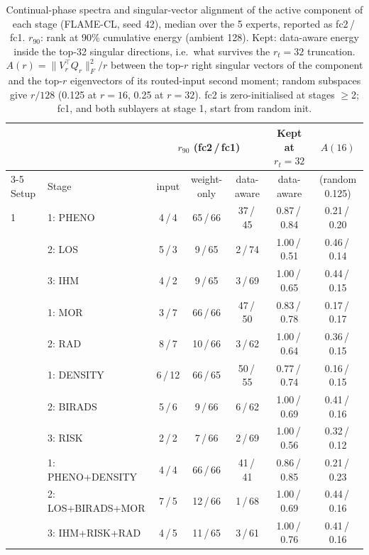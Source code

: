 \begin{table}[t]
\centering
\scriptsize
\setlength{\tabcolsep}{3.2pt}
\caption{Continual-phase spectra and singular-vector alignment of the active component of each stage (FLAME-CL, seed 42), median over the 5 experts, reported as fc2\,/\,fc1. $r_{90}$: rank at 90\% cumulative energy (ambient 128). Kept: data-aware energy inside the top-32 singular directions, i.e.\ what survives the $r_t{=}32$ truncation. $A(r)=\lVert V_r^\top Q_r\rVert_F^2/r$ between the top-$r$ right singular vectors of the component and the top-$r$ eigenvectors of its routed-input second moment; random subspaces give $r/128$ (0.125 at $r{=}16$, 0.25 at $r{=}32$). fc2 is zero-initialised at stages $\geq$2; fc1, and both sublayers at stage 1, start from random init.}
\label{tab:cl-spectra-alignment}
\begin{tabular}{@{}llccccc@{}}
\toprule
 & & \multicolumn{3}{c}{$r_{90}$ (fc2\,/\,fc1)} & Kept at $r_t{=}32$ & $A(16)$ \\
\cmidrule(lr){3-5}
Setup & Stage & input & weight-only & data-aware & data-aware & (random 0.125) \\
\midrule
1 & 1: PHENO & 4\,/\,4 & 65\,/\,66 & 37\,/\,45 & 0.87\,/\,0.84 & 0.21\,/\,0.20 \\
 & 2: LOS & 5\,/\,3 & 9\,/\,65 & 2\,/\,74 & 1.00\,/\,0.51 & 0.46\,/\,0.14 \\
 & 3: IHM & 4\,/\,2 & 9\,/\,65 & 3\,/\,69 & 1.00\,/\,0.65 & 0.44\,/\,0.15 \\
\addlinespace[2pt]
2 & 1: MOR & 3\,/\,7 & 66\,/\,66 & 47\,/\,50 & 0.83\,/\,0.78 & 0.17\,/\,0.17 \\
 & 2: RAD & 8\,/\,7 & 10\,/\,66 & 3\,/\,62 & 1.00\,/\,0.64 & 0.36\,/\,0.15 \\
\addlinespace[2pt]
3 & 1: DENSITY & 6\,/\,12 & 66\,/\,65 & 50\,/\,55 & 0.77\,/\,0.74 & 0.16\,/\,0.15 \\
 & 2: BIRADS & 5\,/\,6 & 9\,/\,66 & 6\,/\,62 & 1.00\,/\,0.69 & 0.41\,/\,0.16 \\
 & 3: RISK & 2\,/\,2 & 7\,/\,66 & 2\,/\,69 & 1.00\,/\,0.56 & 0.32\,/\,0.12 \\
\addlinespace[2pt]
4 & 1: PHENO+DENSITY & 4\,/\,4 & 66\,/\,66 & 41\,/\,41 & 0.86\,/\,0.85 & 0.21\,/\,0.23 \\
 & 2: LOS+BIRADS+MOR & 7\,/\,5 & 12\,/\,66 & 1\,/\,68 & 1.00\,/\,0.69 & 0.44\,/\,0.16 \\
 & 3: IHM+RISK+RAD & 4\,/\,5 & 11\,/\,65 & 3\,/\,61 & 1.00\,/\,0.76 & 0.41\,/\,0.16 \\
\bottomrule
\end{tabular}
\end{table}
